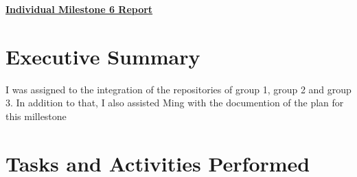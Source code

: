 \documentclass{article}
\begin{document}
\pagestyle{headings}

\begin{center}
{\LARGE\textbf{\underline{{Individual Milestone 6 Report}}}}
\end{center}

\section*{Executive Summary}

I was assigned to the integration of the repositories of group 1, group 2 and group 3.  In addition to that, I also assisted Ming with the documention of the plan for this millestone

\section*{Tasks and Activities Performed}
\end{document}
